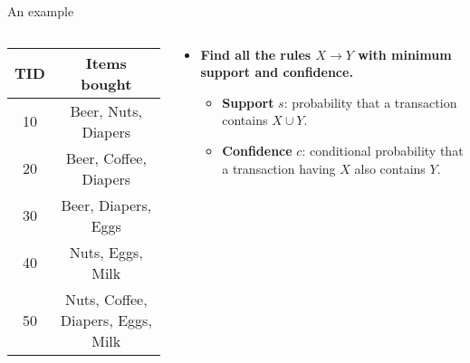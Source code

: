\documentclass[aspectratio=169,t,xcolor=dvipsnames]{beamer}
\begin{document}
  {
    \begin{frame}{An example}
        \begin{columns}
          \begin{column}{0.4\textwidth}
          \begin{tabular}{|c|c|}
          \hline
          \textbf{TID} & \textbf{Items bought}\\\hline
          10 & Beer, Nuts, Diapers \\\hline
          20 & Beer, Coffee, Diapers \\\hline
          30 & Beer, Diapers, Eggs \\\hline
          40 & Nuts, Eggs, Milk \\\hline
          50 & Nuts, Coffee, Diapers, Eggs, Milk\\\hline
          \end{tabular}
          \end{column}
          \begin{column}{0.5\textwidth}
          \vspace{-2cm}
          \begin{itemize}
            \item \textbf{Find all the rules $X \rightarrow Y$ with minimum support and confidence.}
            \begin{itemize}
              \item \textbf{Support} $s$: probability that a transaction contains $X \cup Y$.
              \item \textbf{Confidence} $c$: conditional probability that a transaction having $X$ also contains $Y$.
            \end{itemize}

\end{itemize}
\end{column}
\end{columns}
\end{frame}}
\end{document}
